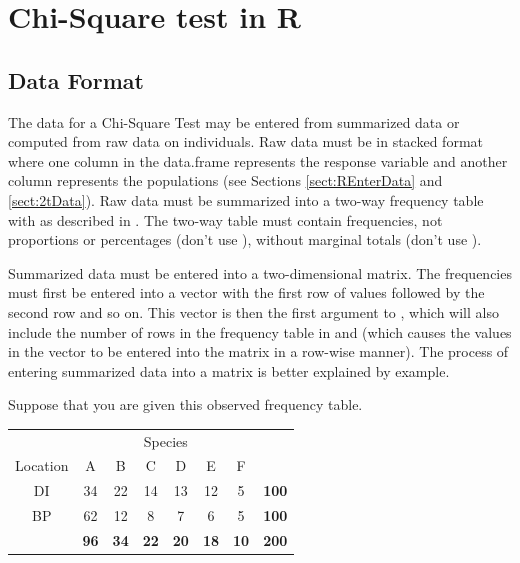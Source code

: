 \documentclass[10pt,openany]{book}\usepackage[]{graphicx}\usepackage[]{color}
\begin{document}
\vspace{6pt}
\section{Chi-Square test in R}
\vspace{-3pt}
\subsection{Data Format}
The data for a Chi-Square Test may be entered from summarized data or computed from raw data on individuals. Raw data must be in stacked format where one column in the data.frame represents the response variable and another column represents the populations (see Sections \ref{sect:REnterData} and \ref{sect:2tData}). Raw data must be summarized into a two-way frequency table with  as described in . The two-way table must contain frequencies, not proportions or percentages (don't use ), without marginal totals (don't use ).

Summarized data must be entered into a two-dimensional matrix. The frequencies must first be entered into a vector with the first row of values followed by the second row and so on. This vector is then the first argument to , which will also include the number of rows in the frequency table in  and  (which causes the values in the vector to be entered into the matrix in a row-wise manner). The process of entering summarized data into a matrix is better explained by example.

Suppose that you are given this observed frequency table.

\begin{center}
  \begin{tabular}{c|c|c|c|c|c|c|c|}
    \multicolumn{1}{c}{} & \multicolumn{6}{c}{Species} & \multicolumn{1}{c}{} \\
    \cline{2-7}
    Location & A & B & C & D & E & F & \multicolumn{1}{c}{} \\
    \hline
    \multicolumn{1}{|c|}{DI} & 34 & 22 & 14 & 13 & 12 & 5 & \textbf{100} \\
    \hline
    \multicolumn{1}{|c|}{BP} & 62 & 12 & 8 & 7 & 6 & 5 & \textbf{100} \\
    \hline
    & \textbf{96} & \textbf{34} & \textbf{22} & \textbf{20} & \textbf{18} & \textbf{10} & \textbf{200} \\
    \cline{2-8}
  \end{tabular}
\end{center}
\end{document}
